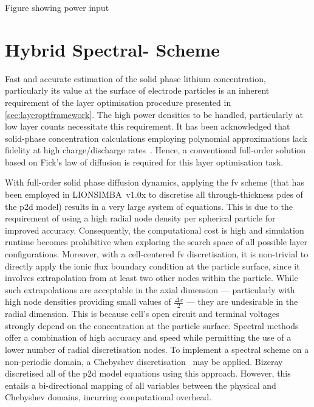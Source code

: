 Figure showing power input
\section{Hybrid Spectral- Scheme}\label{sec:hybridfv-spectral}

Fast  and  accurate  estimation  of   the  solid  phase  lithium  concentration,
particularly  its   value  at   the  surface  of   electrode  particles   is  an
inherent  requirement   of  the   layer  optimisation  procedure   presented  in
\cref{sec:layeroptframework}.   The  high   power  densities   to  be   handled,
particularly  at  low   layer  counts  necessitate  this   requirement.  It  has
been   acknowledged  that   solid-phase  concentration   calculations  employing
polynomial    approximations   lack    fidelity    at   high    charge/discharge
rates~\cite{Santhanagopalan2006}.  Hence,  a  conventional  full-order  solution
based on Fick's law of diffusion is required for this layer optimisation task.

With full-order  solid phase  diffusion dynamics,  applying the  \gls{fv} scheme
(that has been  employed in LIONSIMBA~v1.0x to  discretise all through-thickness
\gls{pde}s of the \gls{p2d} model) results  in a very large system of equations.
This is due to the requirement of using a high radial node density per spherical
particle for improved accuracy. Consequently, the computational cost is high and
simulation  runtime  becomes prohibitive  when  exploring  the search  space  of
all  possible  layer configurations.  Moreover,  with  a cell-centered  \gls{fv}
discretisation,  it is  non-trivial to  directly apply  the ionic  flux boundary
condition at the particle surface, since it involves extrapolation from at least
two other nodes within the particle. While such extrapolations are acceptable in
the axial  dimension --- particularly  with high node densities  providing small
values of $\frac{\Delta x}{2}$ --- they are undesirable in the radial dimension.
This  is because  cell's  open  circuit and  terminal  voltages strongly  depend
on  the  concentration  at  the  particle  surface.  Spectral  methods  offer  a
combination  of high  accuracy and  speed while  permitting the  use of  a lower
number  of radial  discretisation nodes.  To implement  a spectral  scheme on  a
non-periodic  domain,  a  Chebyshev discretisation~\cite{Trefethen2000}  may  be
applied.  Bizeray~\etal{}~\cite{Bizeray2015} discretised  all  of the  \gls{p2d}
model  equations using  this approach.  However, this  entails a  bi-directional
mapping of all  variables between the physical and  Chebyshev domains, incurring
computational overhead.

